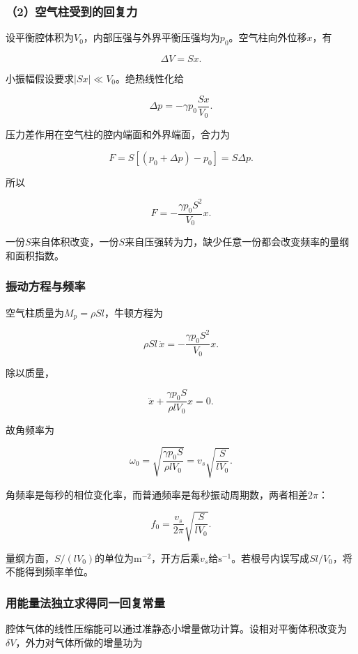\documentclass[12pt,a4paper,fontset=fandol]{ctexart}
\begin{document}
\subsubsection{（2）空气柱受到的回复力}\label{ux7a7aux6c14ux67f1ux53d7ux5230ux7684ux56deux590dux529b}

设平衡腔体积为\(V_0\)，内部压强与外界平衡压强均为\(p_0\)。空气柱向外位移\(x\)，有

\[
\Delta V=Sx.
\]

小振幅假设要求\(|Sx|\ll V_0\)。绝热线性化给

\[
\Delta p=-\gamma p_0\frac{Sx}{V_0}.
\]

压力差作用在空气柱的腔内端面和外界端面，合力为

\[
F=S[(p_0+\Delta p)-p_0]
=S\Delta p.
\]

所以

\[
\boxed{F=-\frac{\gamma p_0S^2}{V_0}x}.
\]

一份\(S\)来自体积改变，一份\(S\)来自压强转为力，缺少任意一份都会改变频率的量纲和面积指数。

\subsubsection{振动方程与频率}\label{ux632fux52a8ux65b9ux7a0bux4e0eux9891ux7387}

空气柱质量为\(M_p=\rho Sl\)，牛顿方程为

\[
\rho Sl\,\ddot x
=-\frac{\gamma p_0S^2}{V_0}x.
\]

除以质量，

\[
\ddot x+\frac{\gamma p_0S}{\rho lV_0}x=0.
\]

故角频率为

\[
\omega_0=
\sqrt{\frac{\gamma p_0S}{\rho lV_0}}
=v_s\sqrt{\frac{S}{lV_0}}.
\]

角频率是每秒的相位变化率，而普通频率是每秒振动周期数，两者相差\(2\pi\)：

\[
\boxed{f_0=\frac{v_s}{2\pi}
\sqrt{\frac{S}{lV_0}}}.
\]

量纲方面，\(S/(lV_0)\)的单位为\(\mathrm{m^{-2}}\)，开方后乘\(v_s\)给\(\mathrm{s^{-1}}\)。若根号内误写成\(Sl/V_0\)，将不能得到频率单位。

\subsubsection{用能量法独立求得同一回复常量}\label{ux7528ux80fdux91cfux6cd5ux72ecux7acbux6c42ux5f97ux540cux4e00ux56deux590dux5e38ux91cf}

腔体气体的线性压缩能可以通过准静态小增量做功计算。设相对平衡体积改变为\(\delta V\)，外力对气体所做的增量功为
\end{document}
